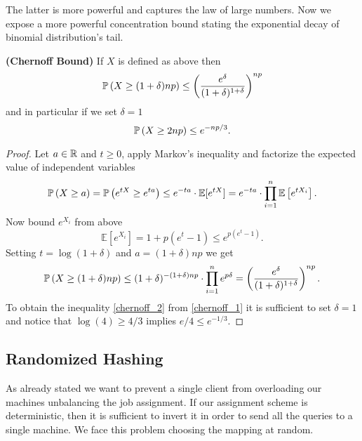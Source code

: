 The latter is more powerful and captures the law of large numbers. Now we expose
a more powerful concentration bound stating the exponential decay
of binomial distribution's tail.

\begin{theorem}{\textbf{(Chernoff Bound)}}
  If $X$ is defined as above then
  \begin{equation}
    \operatorname{\mathbb{P}}\left(X \geq (1+\delta) np\right) \leq \left(\frac{e^\delta}{(1+\delta)^{1+\delta}}\right)^{np}
  \end{equation}\label{chernoff_1}
  and in particular if we set $\delta = 1$
  \begin{equation}\label{chernoff_2}
    \operatorname{\mathbb{P}}\left(X \geq 2 np\right) \leq e^{-np/3}.
  \end{equation}
\end{theorem}
\begin{proof}
  Let $a \in \operatorname{\mathbb{R}}$ and $t \geq 0$, apply Markov's inequality and
  factorize the expected value of independent variables
  \begin{equation*}
    \operatorname{\mathbb{P}}\left(X \geq a \right) = \operatorname{\mathbb{P}}\left( e^{tX} \geq e^{ta} \right) \leq
      e^{-ta} \cdot \mathbb{E} [e^{tX}] =
    e^{-ta} \cdot \prod_{i = 1}^n \mathbb{E}\left[e^{t X_i}\right]. 
  \end{equation*}
  Now bound $e^{X_i}$ from above
  \begin{equation*}
    \mathbb{E}\left[e^{X_i}\right] = 1  + p \left( e^t - 1 \right) \leq
    e^{p \left( e^t - 1 \right)}.
  \end{equation*}
  Setting $t = \log(1 + \delta)$ and $a = (1+\delta)np$ we get
  \begin{equation*}
    \operatorname{\mathbb{P}}\left(X \geq (1+\delta)np \right) \leq
     (1+\delta)^{-(1+\delta)np} \cdot \prod_{i = 1}^n e^{p\delta} =
    \left(\frac{e^\delta}{(1+\delta)^{1+\delta}}\right)^{np}.
  \end{equation*}
  To obtain the inequality \eqref{chernoff_2} from \eqref{chernoff_1} it is sufficient to set $\delta = 1$ and notice that $ \log(4) \geq 4 / 3$ implies $e / 4 \leq e^{-1/3}$.
\end{proof}

\subsection{Randomized Hashing}
As already stated we want to prevent a single client from overloading
our machines unbalancing the job assignment. If our assignment scheme is
deterministic, then it is sufficient to invert it in order to send all the
queries to a single machine. We face this problem choosing the mapping
at random.

